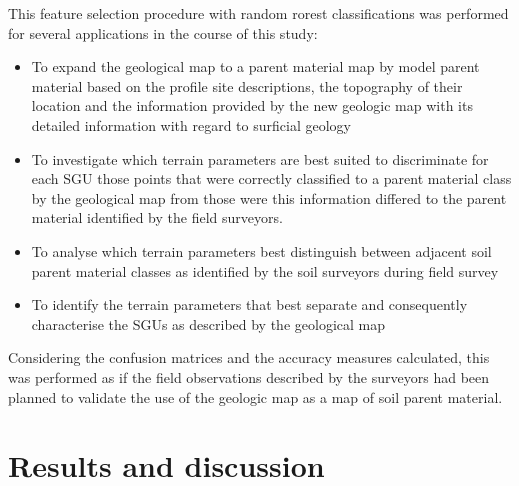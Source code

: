 \documentclass[preprint,12pt,authoryear]{elsarticle}
\begin{document}
This feature selection procedure with random rorest classifications was performed for several applications in the course of this study:
\begin{itemize}
\item To expand the geological map to a parent material map by model parent material based on the profile site descriptions, the topography of their location and the information provided by the new geologic map with its detailed information with regard to surficial geology
\item To investigate which terrain parameters are best suited to discriminate for each SGU those points that were correctly classified to a parent material class by the geological map from those were this information differed to the parent material identified by the field surveyors.
\item To  analyse which terrain parameters best distinguish between adjacent soil parent material classes as identified by the soil surveyors during field survey
\item To identify the terrain parameters that best separate and consequently characterise the SGUs as described by the geological map
\end{itemize}
Considering the confusion matrices and the accuracy measures calculated, this was performed as if the field observations described by the surveyors had been planned to validate the use of the geologic map as a map of soil parent material.



\clearpage
\section{Results and discussion}
\end{document}
